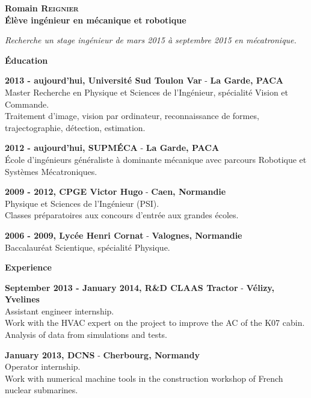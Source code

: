 \documentclass[a4paper,11pt,final]{memoir}
\newcommand{\Sep}{\vspace{1.5em}}
\newcommand{\SmallSep}{\vspace{0.5em}}
\newenvironment{AboutMe}
	{\ignorespaces%
}
	{\Sep\ignorespacesafterend}
\newcommand{\CVSection}[1]
	{\Large\textbf{#1}\par
	\SmallSep\normalsize\normalfont}
\newcommand{\CVItem}[1]
	{\textbf{\color{RoyalBlue} #1}\normalsize\normalfont}
\newcommand{\city}[1]
	{{\small\textbf{#1}}\normalsize\normalfont}
\begin{document}
\Huge\bfseries {\color{RoyalBlue} Romain \textsc{Reignier}} \\
\Large\bfseries  Élève ingénieur en mécanique et robotique\\

\normalsize\normalfont

\begin{AboutMe}
\emph{Recherche un stage ingénieur de mars 2015 à septembre 2015 en mécatronique.}
\end{AboutMe}

\CVSection{Éducation}

\CVItem{2013 - aujourd'hui, Université Sud Toulon Var} - \city{La Garde, PACA}\\
Master Recherche en Physique et Sciences de l'Ingénieur, spécialité Vision et Commande.\\
Traitement d'image, vision par ordinateur, reconnaissance de formes, trajectographie, détection, estimation.\\
\SmallSep

\CVItem{2012 - aujourd'hui, SUPMÉCA} - \city{La Garde, PACA}\\
École d'ingénieurs généraliste à dominante mécanique avec parcours Robotique et Systèmes Mécatroniques.
\SmallSep

\CVItem{2009 - 2012, CPGE Victor Hugo} - \city{Caen, Normandie}\\
Physique et Sciences de l'Ingénieur (PSI).\\
Classes préparatoires aux concours d'entrée aux grandes écoles.
\SmallSep

\CVItem{2006 - 2009, Lycée Henri Cornat} - \city{Valognes, Normandie}\\
Baccalauréat Scientique, spécialité Physique.
\Sep

\CVSection{Experience}
\CVItem{September 2013 - January 2014, R\&D CLAAS Tractor} - \city{Vélizy, Yvelines}\\
Assistant engineer internship.\\
Work with the HVAC expert on the project to improve the AC of the K07 cabin.
Analysis of data from simulations and tests.
\SmallSep

\CVItem{January 2013, DCNS} - \city{Cherbourg, Normandy}\\
Operator internship.\\
Work with numerical machine tools in the construction workshop of French nuclear
submarines.
\SmallSep
\end{document}
